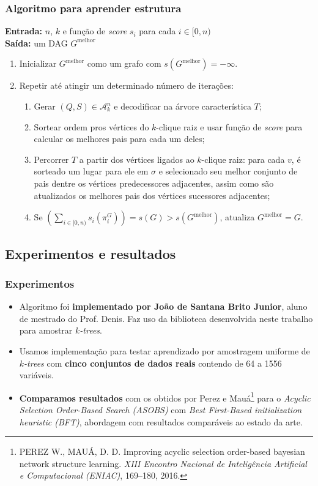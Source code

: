 \documentclass{beamer}
\begin{document}
  \begin{frame}
    \frametitle{Algoritmo para aprender estrutura}

    {\footnotesize
      \textbf{Entrada:} $n$, $k$ e função de \emph{score} $s_i$ para cada $i \in [0, n)$\\
      \textbf{Saída:} um DAG $G^{\text{melhor}}$

      \begin{enumerate}
        \item Inicializar $G^{\text{melhor}}$ como um grafo com $s(G^{\text{melhor}}) = -\infty$.
        \item Repetir até atingir um determinado número de iterações:
          \begin{enumerate}
            \item Gerar $(Q, S) \in \mathcal{A}^n_k$ e decodificar na árvore característica $T$;
            \item Sortear ordem pros vértices do $k$-clique raiz e usar função de \emph{score} para calcular os melhores pais para cada um deles;
            \item Percorrer $T$ a partir dos vértices ligados ao $k$-clique raiz: para cada $v$, é sorteado um lugar para ele em $\sigma$ e selecionado seu melhor conjunto de pais dentre os vértices predecessores adjacentes, assim como são atualizados os melhores pais dos vértices sucessores adjacentes;
            \item Se $\left(\sum_{i \in [0,n)} s_i(\pi^G_{i})\right) = s(G) > s(G^{\text{melhor}})$, atualiza $G^{\text{melhor}} = G$.
          \end{enumerate}
      \end{enumerate}
    }
  \end{frame}

  \subsection{Experimentos e resultados}

  \begin{frame}
    \frametitle{Experimentos}

    \begin{itemize}
      \item Algoritmo foi \textbf{implementado por João de Santana Brito Junior}, aluno de mestrado do Prof. Denis. Faz uso da biblioteca desenvolvida neste trabalho para amostrar \emph{$k$-trees}.
      \item Usamos implementação para testar aprendizado por amostragem uniforme de \emph{$k$-trees} com \textbf{cinco conjuntos de dados reais} contendo de 64 a 1556 variáveis.
      \item \textbf{Comparamos resultados} com os obtidos por Perez e Mauá\footnote{\scriptsize PEREZ W., MAUÁ, D. D. Improving acyclic selection order-based bayesian network structure learning. \emph{XIII Encontro Nacional de Inteligência Artificial e Computacional (ENIAC)}, 169--180, 2016.} para o \emph{Acyclic Selection Order-Based Search (ASOBS)} com \emph{Best First-Based initialization heuristic (BFT)}, abordagem com resultados comparáveis ao estado da arte.
    \end{itemize}
  \end{frame}
\end{document}
